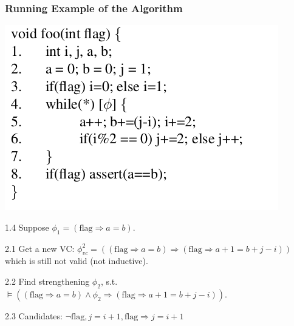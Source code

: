 \documentclass[11pt]{beamer}
\begin{document}
\begin{frame}\frametitle{Running Example of the Algorithm}
\begin{center}

\includegraphics[scale=0.25]{exp.png}

\end{center}
1.4 Suppose $\phi_1 = (\text{flag}\Rightarrow a = b)$.

2.1 Get a new VC: $\phi_{vc}^2 = ((\text{flag}\Rightarrow a = b)\Rightarrow (\text{flag}\Rightarrow a + 1 = b + j - i))$ which is still not valid (not inductive).

2.2 Find strengthening $\phi_2$, s.t. $\models ((\text{flag}\Rightarrow a = b )\wedge \phi_2 \Rightarrow (\text{flag}\Rightarrow a + 1 = b + j - i))$.

2.3 Candidates: $\neg \text{flag}, j = i + 1, \text{flag}\Rightarrow  j = i + 1$
\end{frame}
\end{document}
